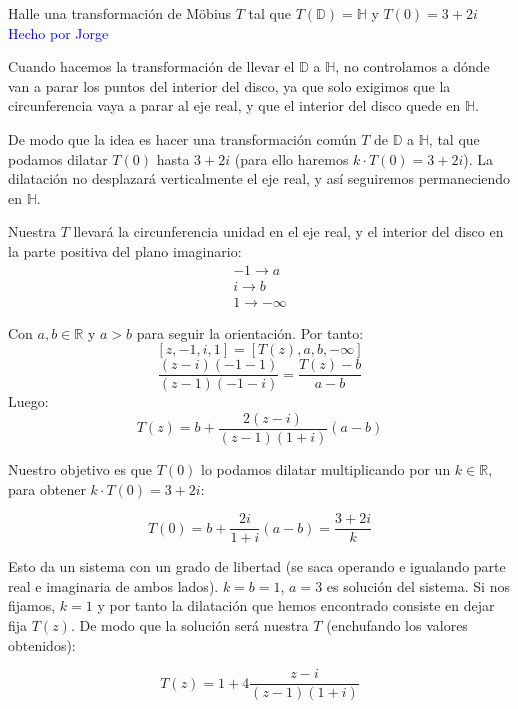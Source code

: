 \begin{problem}
Halle una transformación de Möbius $T$ tal que $T(\mathbb{D}) = \mathbb{H}$ y $T(0) = 3 + 2i$
\solution
\textcolor{blue}{Hecho por Jorge}

Cuando hacemos la transformación de llevar el $\mathbb{D}$ a $\mathbb{H}$, no controlamos a dónde van a parar los puntos del interior del disco, ya que solo exigimos que la circunferencia vaya a parar al eje real, y que el interior del disco quede en $\mathbb{H}$.

De modo que la idea es hacer una transformación común $T$ de $\mathbb{D}$ a $\mathbb{H}$, tal que podamos dilatar $T(0)$ hasta $3+2i$ (para ello haremos $k·T(0) = 3+2i$). La dilatación no desplazará verticalmente el eje real, y así seguiremos permaneciendo en $\mathbb{H}$.

Nuestra $T$ llevará la circunferencia unidad en el eje real, y el interior del disco en la parte positiva del plano imaginario:
\begin{align*}
	-1 \to a\\
	i \to b\\
	1 \to -∞
\end{align*}

Con $a,b ∈ ℝ$ y $a>b$ para seguir la orientación. Por tanto:
\[ [z,-1,i,1] = [T(z),a,b,-∞] \]
\[\frac{(z-i)(-1-1)}{(z-1)(-1-i)} = \frac{T(z) - b}{a-b}\]
Luego:
\[T(z) = b + \frac{2(z-i)}{(z-1)(1+i)}(a-b)\]

Nuestro objetivo es que $T(0)$ lo podamos dilatar multiplicando por un $k ∈ ℝ$, para obtener $k·T(0) = 3+2i$:

\[T(0) = b + \frac{2i}{1+i}(a-b) = \frac{3+2i}{k}\]

Esto da un sistema con un grado de libertad (se saca operando e igualando parte real e imaginaria de ambos lados). $k=b=1$, $a=3$ es solución del sistema. Si nos fijamos, $k=1$ y por tanto la dilatación que hemos encontrado consiste en dejar fija $T(z)$. De modo que la solución será nuestra $T$ (enchufando los valores obtenidos):

\[T(z) = 1 + 4 \frac{z-i}{(z-1)(1+i)}\]


\end{problem}


